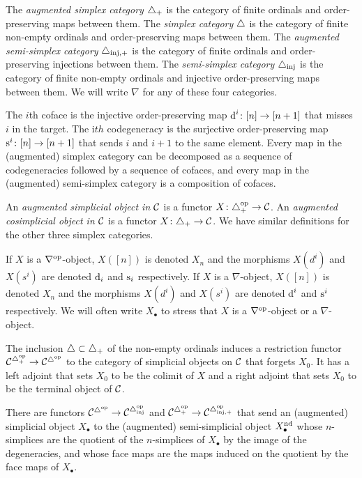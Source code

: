 \begin{definition}
	The \emph{augmented simplex category} $\triangle_{+}$ is the category of finite ordinals and order-preserving maps between them. The \emph{simplex category} $\triangle$ is the category of finite non-empty ordinals and order-preserving maps between them.  
	The \emph{augmented semi-simplex category} $\triangle_{\mathrm{inj},+}$ is the category of finite ordinals and order-preserving injections between them. The \emph{semi-simplex category} $\triangle_{\mathrm{inj}}$ is the category of finite non-empty ordinals and injective order-preserving maps between them. We will write $\nabla$ for any of these four categories.
\end{definition}



The $i$th coface is the injective order-preserving map $\operatorname{d}^i\colon [n] \to [n+1]$ that misses $i$ in the target. The i$th$ codegeneracy is the surjective order-preserving map $\operatorname{s}^i\colon [n]\to [n+1]$ that sends $i$ and $i+1$ to the same element. Every map in the (augmented) simplex category can be decomposed as a sequence of codegeneracies followed by a sequence of cofaces, and every map in the (augmented) semi-simplex category is a composition of cofaces.


\begin{definition}
	An \emph{augmented simplicial object in $\mathcal{C}$} is a functor $X \colon \triangle_{+}^\mathrm{op} \to \mathcal{C}$.
	An \emph{augmented cosimplicial object in $\mathcal{C}$} is a functor $X \colon \triangle_{+} \to \mathcal{C}$. We have similar definitions for the other three simplex categories.
\end{definition}

If $X$ is a $\nabla^{{\mathrm{op}}}$-object, $X([n])$ is denoted $X_n$ and the morphisms $X(d^i)$ and $X(s^i)$ are denoted $\operatorname{d}_i$ and $\operatorname{s}_i$ respectively. If $X$ is a $\nabla$-object, $X([n])$ is denoted $X_n$ and the morphisms $X(d^i)$ and $X(s^i)$ are denoted $\operatorname{d}^i$ and $\operatorname{s}^i$ respectively.
We will often write $X_\bullet$ to stress that $X$ is a $\nabla^{{\mathrm{op}}}$-object or a $\nabla$-object.

The inclusion $\triangle \subset \triangle_{+}$ of the non-empty ordinals induces a restriction functor $\mathcal{C}^{\triangle_{+}^{{\mathrm{op}}}} \to \mathcal{C}^{\triangle^{{\mathrm{op}}}}$ to the category of simplicial objects on $\mathcal{C}$ that forgets $X_{0}$. It has a left adjoint that sets $X_{0}$ to be the colimit of $X$ and a right adjoint that sets $X_{0}$ to be the terminal object of $\mathcal{C}$.

There are functors $\mathcal{C}^{\triangle^{{\mathrm{op}}}}\to \mathcal{C}^{\triangle_{\mathrm{inj}}^{{\mathrm{op}}}}$ and $\mathcal{C}^{\triangle_{+}^{{\mathrm{op}}}}\to \mathcal{C}^{\triangle_{\mathrm{inj},+}^{{\mathrm{op}}}}$ that send an (augmented) simplicial object $X_\bullet$ to the (augmented) semi-simplicial object $X_\bullet^{\mathrm{nd}}$ whose $n$-simplices are the quotient of the $n$-simplices of $X_\bullet$ by the image of the degeneracies, and whose face maps are the maps induced on the quotient by the face maps of $X_\bullet$.


